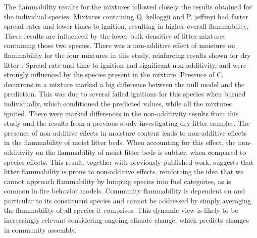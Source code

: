 \documentclass[fire,article,submit,moreauthors,pdftex]{Definitions/mdpi}
\begin{document}
The flammability results for the mixtures followed closely the results obtained for the individual species. Mixtures containing Q. kelloggii and P. jeffreyi had faster spread rates and lower times to ignition, resulting in higher overall flammability. These results are influenced by the lower bulk densities of litter mixtures containing those two species. There was a non-additive effect of moisture on flammability for the four mixtures in this study, reinforcing results shown for dry litter \citep{Magalhaes+Schwilk-2012, VanAltena+Logtestjin+etal-2012}. Spread rate and time to ignition had significant non-additivity, and were strongly influenced by the species present in the mixture. Presence of C. decurrens in a mixture marked a big difference between the null model and the prediction. This was due to several failed ignitions for this species when burned individually, which conditioned the predicted values, while all the mixtures ignited. There were marked differences in the non-additivity results from this study and the results from a previous study investigating dry litter samples. The presence of non-additive effects in moisture content leads to non-additive effects in the flammability of moist litter beds. When accounting for this effect, the non-additivity on the flammability of moist litter beds is subtler, when compared to species effects. This result, together with previously published work, suggests that litter flammability is prone to non-additive effects, reinforcing the idea that we cannot approach flammability by lumping species into fuel categories, as is common in fire behavior models. Community flammability is dependent on and particular to its constituent species and cannot be addressed by simply averaging the flammability of all species it comprises. This dynamic view is likely to be increasingly relevant considering ongoing climate change, which predicts changes in community assembly.

\end{document}
